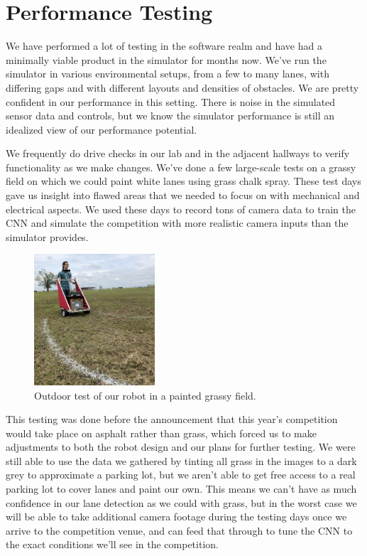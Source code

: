 \section{Performance Testing}

We have performed a lot of testing in the software realm and have had a minimally viable product in the simulator for months now. We've run the simulator in various environmental setups, from a few to many lanes, with differing gaps and with different layouts and densities of obstacles. We are pretty confident in our performance in this setting. There is noise in the simulated sensor data and controls, but we know the simulator performance is still an idealized view of our performance potential.

We frequently do drive checks in our lab and in the adjacent hallways to verify functionality as we make changes. We've done a few large-scale tests on a grassy field on which we could paint white lanes using grass chalk spray. These test days gave us insight into flawed areas that we needed to focus on with mechanical and electrical aspects. We used these days to record tons of camera data to train the CNN and simulate the competition with more realistic camera inputs than the simulator provides. 

\begin{figure}[h]
    \centering
    \includegraphics[width=0.4\textwidth]{images/outdoor_test.PNG}
    \caption{Outdoor test of our robot in a painted grassy field.}
\end{figure}

This testing was done before the announcement that this year's competition would take place on asphalt rather than grass, which forced us to make adjustments to both the robot design and our plans for further testing. We were still able to use the data we gathered by tinting all grass in the images to a dark grey to approximate a parking lot, but we aren't able to get free access to a real parking lot to cover lanes and paint our own. This means we can't have as much confidence in our lane detection as we could with grass, but in the worst case we will be able to take additional camera footage during the testing days once we arrive to the competition venue, and can feed that through to tune the CNN to the exact conditions we'll see in the competition.

